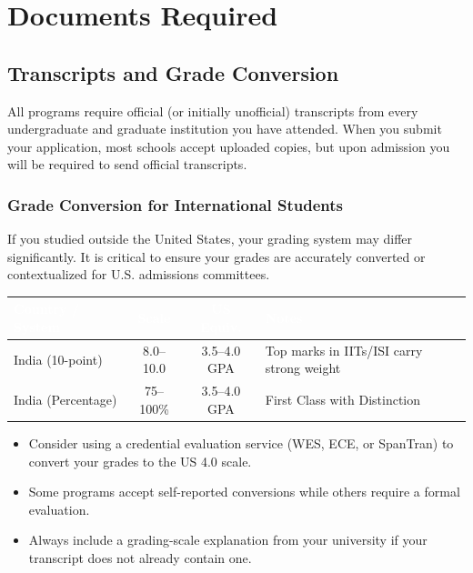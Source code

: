 \documentclass[11pt, letterpaper]{article}
\begin{document}
\section{Documents Required}

\subsection{Transcripts and Grade Conversion}

All programs require official (or initially unofficial) transcripts from every undergraduate and graduate institution you have attended. When you submit your application, most schools accept uploaded copies, but upon admission you will be required to send official transcripts.

\subsubsection*{Grade Conversion for International Students}

If you studied outside the United States, your grading system may differ significantly. It is critical to ensure your grades are accurately converted or contextualized for U.S. admissions committees.

\vspace{6pt}
\begin{center}
\small
\renewcommand{\arraystretch}{1.4}
\begin{tabular}{>{\raggedright\arraybackslash}p{3cm} c c >{\raggedright\arraybackslash}p{4cm}}
\toprule
\rowcolor{ctabhead} \textcolor{white}{\textbf{Country / System}} & \textcolor{white}{\textbf{Scale}} & \textcolor{white}{\textbf{US Equiv.}} & \textcolor{white}{\textbf{Notes}} \\
\midrule
India (10-point)     & 8.0--10.0    & 3.5--4.0 GPA & Top marks in IITs/ISI carry strong weight \\
India (Percentage)   & 75--100\%    & 3.5--4.0 GPA & First Class with Distinction \\
\bottomrule
\end{tabular}
\end{center}
\vspace{6pt}

\begin{itemize}[leftmargin=*, itemsep=2pt]
    \item Consider using a credential evaluation service (WES, ECE, or SpanTran) to convert your grades to the US 4.0 scale.
    \item Some programs accept self-reported conversions while others require a formal evaluation.
    \item Always include a grading-scale explanation from your university if your transcript does not already contain one.
\end{itemize}
\end{document}
